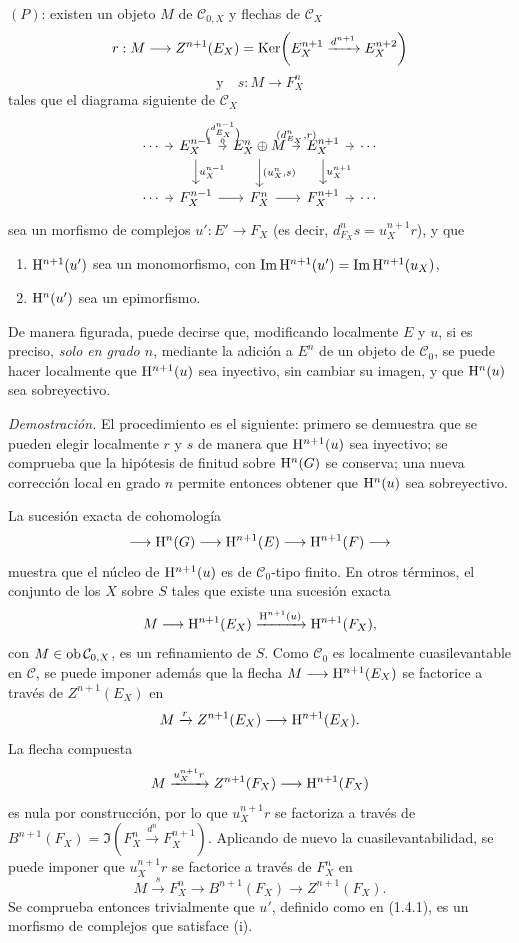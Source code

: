 \((P)\): existen un objeto \(M\) de \(\mathcal C_{0,X}\) y flechas de \(\mathcal C_X\)
\[
  r:M\longrightarrow Z^{n+1}(E_X)=
  \operatorname{Ker}\!\left(E_X^{n+1}\xrightarrow{d^{n+1}}E_X^{n+2}\right)
\]
\[
  \text{y}\quad s:M\longrightarrow F_X^n
\]
tales que el diagrama siguiente de \(\mathcal C_X\)
\[
\begin{tikzcd}[column sep=tiny]
\cdots \arrow[r] & E_X^{n-1}
 \arrow[r,"{\binom{d_{E_X}^{n-1}}{0}}"]
 \arrow[d,"u_X^{n-1}"] &
E_X^n\oplus M
 \arrow[r,"{(d_{E_X}^n,r)}"]
 \arrow[d,"{(u_X^n,s)}"] &
E_X^{n+1} \arrow[r] \arrow[d,"u_X^{n+1}"] &
\cdots\\
\cdots \arrow[r] & F_X^{n-1} \arrow[r] &
F_X^n \arrow[r] &
F_X^{n+1} \arrow[r] &
\cdots
\end{tikzcd}
\]
sea un morfismo de complejos \(u':E'\to F_X\) (es decir, \(d_{F_X}^n s=u_X^{n+1}r\)), y que
\begin{enumerate}[label=(\roman*)]
\item \(\mathrm H^{n+1}(u')\) sea un monomorfismo, con \(\operatorname{Im}\mathrm H^{n+1}(u')=\operatorname{Im}\mathrm H^{n+1}(u_X)\),
\item \(\mathrm H^n(u')\) sea un epimorfismo.
\end{enumerate}

De manera figurada, puede decirse que, modificando localmente \(E\) y \(u\), si es preciso, \emph{solo en grado \(n\)}, mediante la adición a \(E^n\) de un objeto de \(\mathcal C_0\), se puede hacer localmente que \(\mathrm H^{n+1}(u)\) sea inyectivo, sin cambiar su imagen, y que \(\mathrm H^n(u)\) sea sobreyectivo.

\emph{Demostración.} El procedimiento es el siguiente: primero se demuestra que se pueden elegir localmente \(r\) y \(s\) de manera que \(\mathrm H^{n+1}(u)\) sea inyectivo; se comprueba que la hipótesis de finitud sobre \(\mathrm H^n(G)\) se conserva; una nueva corrección local en grado \(n\) permite entonces obtener que \(\mathrm H^n(u)\) sea sobreyectivo.

La sucesión exacta de cohomología
\[
  \longrightarrow \mathrm H^n(G)\longrightarrow
  \mathrm H^{n+1}(E)\longrightarrow
  \mathrm H^{n+1}(F)\longrightarrow
\]
muestra que el núcleo de \(\mathrm H^{n+1}(u)\) es de \(\mathcal C_0\)-tipo finito. En otros términos, el conjunto de los \(X\) sobre \(S\) tales que existe una sucesión exacta
\[
  M\longrightarrow \mathrm H^{n+1}(E_X)
  \xrightarrow{\mathrm H^{n+1}(u)}
  \mathrm H^{n+1}(F_X),
\]
con \(M\in\operatorname{ob}\mathcal C_{0,X}\), es un refinamiento de \(S\). Como \(\mathcal C_0\) es localmente cuasilevantable en \(\mathcal C\), se puede imponer además que la flecha \(M\longrightarrow \mathrm H^{n+1}(E_X)\) se factorice a través de \(Z^{n+1}(E_X)\) en
\[
  M\xrightarrow{r}Z^{n+1}(E_X)\longrightarrow \mathrm H^{n+1}(E_X).
\]
La flecha compuesta
\[
  M\xrightarrow{u_X^{n+1}r}Z^{n+1}(F_X)\longrightarrow \mathrm H^{n+1}(F_X)
\]
es nula por construcción, por lo que \(u_X^{n+1}r\) se factoriza a través de \(B^{n+1}(F_X)=\Im\!\left(F_X^n\xrightarrow{d^n}F_X^{n+1}\right)\). Aplicando de nuevo la cuasilevantabilidad, se puede imponer que \(u_X^{n+1}r\) se factorice a través de \(F_X^n\) en
\[
  M\xrightarrow{s}F_X^n\longrightarrow B^{n+1}(F_X)\longrightarrow Z^{n+1}(F_X).
\]
Se comprueba entonces trivialmente que \(u'\), definido como en (1.4.1), es un morfismo de complejos que satisface (i).

